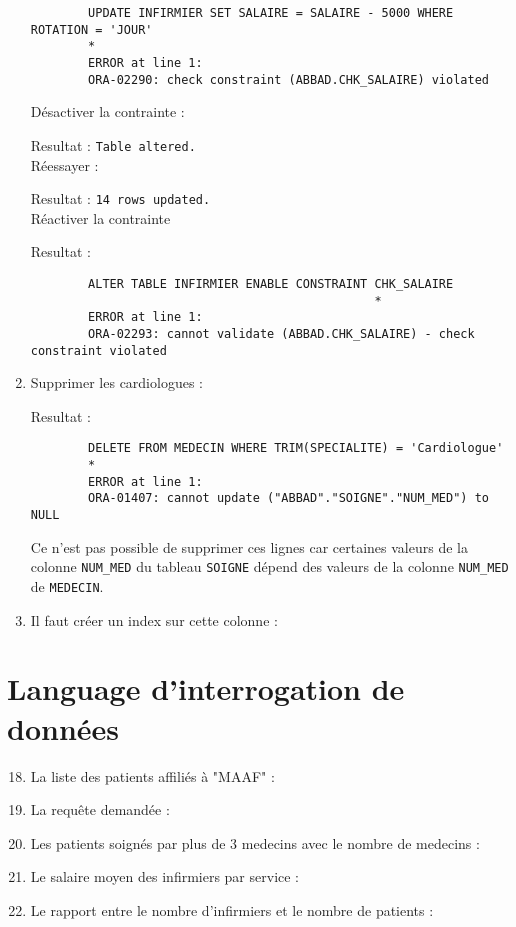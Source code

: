 \documentclass[12pt,a4paper]{article}
\begin{document}
\begin{enumerate}
\begin{verbatim}
		UPDATE INFIRMIER SET SALAIRE = SALAIRE - 5000 WHERE ROTATION = 'JOUR'
		*
		ERROR at line 1:
		ORA-02290: check constraint (ABBAD.CHK_SALAIRE) violated
		\end{verbatim}
		Désactiver la contrainte :
		
		Resultat : \texttt{Table altered.}\\
		Réessayer :
		
		Resultat : \texttt{14 rows updated.}\\
		Réactiver la contrainte
		
		Resultat :
		\begin{verbatim}
		ALTER TABLE INFIRMIER ENABLE CONSTRAINT CHK_SALAIRE
		                                        *
		ERROR at line 1:
		ORA-02293: cannot validate (ABBAD.CHK_SALAIRE) - check constraint violated
		\end{verbatim}
		\item Supprimer les cardiologues :
		
		Resultat :
		\begin{verbatim}
		DELETE FROM MEDECIN WHERE TRIM(SPECIALITE) = 'Cardiologue'
		*
		ERROR at line 1:
		ORA-01407: cannot update ("ABBAD"."SOIGNE"."NUM_MED") to NULL
		\end{verbatim}
		Ce n'est pas possible de supprimer ces lignes car certaines valeurs de la colonne \texttt{NUM\_MED} du
		tableau \texttt{SOIGNE} dépend des valeurs de la colonne \texttt{NUM\_MED} de \texttt{MEDECIN}.
		\item Il faut créer un index sur cette colonne :
		
	\end{enumerate}
\section{Language d'interrogation de données}
	\begin{enumerate}
		\setcounter{enumi}{17}
		\item La liste des patients affiliés à "MAAF" :
		
		\item La requête demandée :
		
		\item Les patients soignés par plus de 3 medecins avec le nombre de medecins :
		
		\item Le salaire moyen des infirmiers par service :
		
		\item Le rapport entre le nombre d'infirmiers et le nombre de patients :
		
	\end{enumerate}
\end{document}
